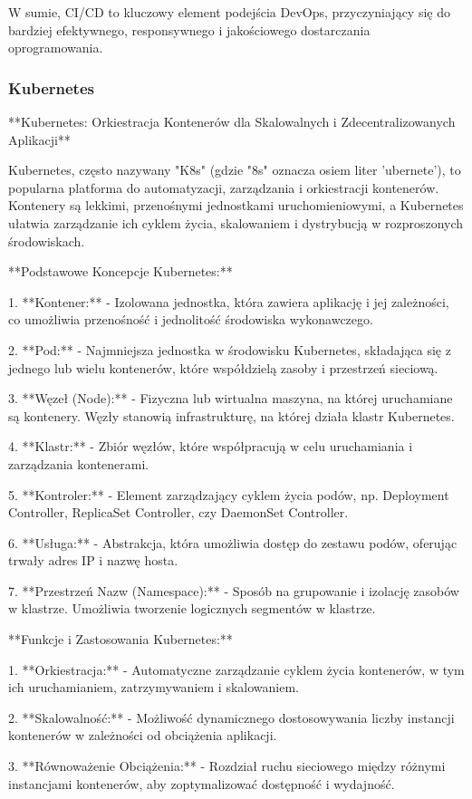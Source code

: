 W sumie, CI/CD to kluczowy element podejścia DevOps, przyczyniający się do bardziej efektywnego, responsywnego i jakościowego dostarczania oprogramowania.
\subsubsection{Kubernetes}
**Kubernetes: Orkiestracja Kontenerów dla Skalowalnych i Zdecentralizowanych Aplikacji**

Kubernetes, często nazywany "K8s" (gdzie "8s" oznacza osiem liter 'ubernete'), to popularna platforma do automatyzacji, zarządzania i orkiestracji kontenerów. Kontenery są lekkimi, przenośnymi jednostkami uruchomieniowymi, a Kubernetes ułatwia zarządzanie ich cyklem życia, skalowaniem i dystrybucją w rozproszonych środowiskach.

**Podstawowe Koncepcje Kubernetes:**

1. **Kontener:**
   - Izolowana jednostka, która zawiera aplikację i jej zależności, co umożliwia przenośność i jednolitość środowiska wykonawczego.

2. **Pod:**
   - Najmniejsza jednostka w środowisku Kubernetes, składająca się z jednego lub wielu kontenerów, które współdzielą zasoby i przestrzeń sieciową.

3. **Węzeł (Node):**
   - Fizyczna lub wirtualna maszyna, na której uruchamiane są kontenery. Węzły stanowią infrastrukturę, na której działa klastr Kubernetes.

4. **Klastr:**
   - Zbiór węzłów, które współpracują w celu uruchamiania i zarządzania kontenerami.

5. **Kontroler:**
   - Element zarządzający cyklem życia podów, np. Deployment Controller, ReplicaSet Controller, czy DaemonSet Controller.

6. **Usługa:**
   - Abstrakcja, która umożliwia dostęp do zestawu podów, oferując trwały adres IP i nazwę hosta.

7. **Przestrzeń Nazw (Namespace):**
   - Sposób na grupowanie i izolację zasobów w klastrze. Umożliwia tworzenie logicznych segmentów w klastrze.

**Funkcje i Zastosowania Kubernetes:**

1. **Orkiestracja:**
   - Automatyczne zarządzanie cyklem życia kontenerów, w tym ich uruchamianiem, zatrzymywaniem i skalowaniem.

2. **Skalowalność:**
   - Możliwość dynamicznego dostosowywania liczby instancji kontenerów w zależności od obciążenia aplikacji.

3. **Równoważenie Obciążenia:**
   - Rozdział ruchu sieciowego między różnymi instancjami kontenerów, aby zoptymalizować dostępność i wydajność.

